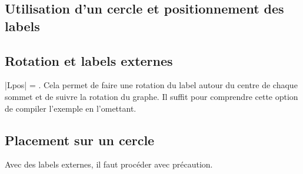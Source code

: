 \begin{tkzexample}[latex=7cm,small]  
\end{tkzexample} 


\subsection{Utilisation d'un cercle  et positionnement des labels }

\begin{tkzexample}[latex=7cm,small]   
\end{tkzexample}



\subsection{Rotation  et labels externes }

|Lpos| = . Cela permet de faire une rotation du label autour du centre de chaque sommet et de suivre la rotation du graphe. Il suffit pour comprendre cette option de compiler l'exemple en l'omettant.  


\begin{tkzexample}[latex=7cm,small] 
\end{tkzexample}

\subsection{Placement sur un cercle }

Avec des labels externes, il faut procéder avec précaution. 

\begin{tkzexample}[latex=7cm,small] 
\end{tkzexample}
\endinput
